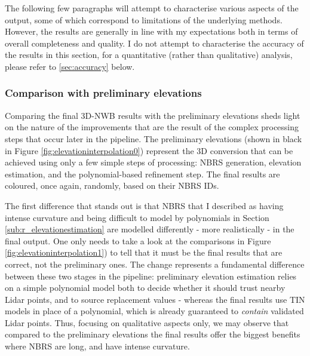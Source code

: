 The following few paragraphs will attempt to characterise various aspects of the output, some of which correspond to limitations of the underlying methods. However, the results are generally in line with my expectations both in terms of overall completeness and quality. I do not attempt to characterise the accuracy of the results in this section, for a quantitative (rather than qualitative) analysis, please refer to \ref{sec:accuracy} below.

\subsubsection{Comparison with preliminary elevations}

Comparing the final 3D-NWB results with the preliminary elevations sheds light on the nature of the improvements that are the result of the complex processing steps that occur later in the pipeline. The preliminary elevations (shown in black in Figure \ref{fig:elevationinterpolation0}) represent the 3D conversion that can be achieved using only a few simple steps of processing: NBRS generation, elevation estimation, and the polynomial-based refinement step. The final results are coloured, once again, randomly, based on their NBRS IDs.

The first difference that stands out is that NBRS that I described as having intense curvature and being difficult to model by polynomials in Section \ref{sub:r_elevationestimation} are modelled differently - more realistically - in the final output. One only needs to take a look at the comparisons in Figure \ref{fig:elevationinterpolation1}) to tell that it must be the final results that are correct, not the preliminary ones. The change represents a fundamental difference between these two stages in the pipeline: preliminary elevation estimation relies on a simple polynomial model both to decide whether it should trust nearby Lidar points, and to source replacement values - whereas the final results use TIN models in place of a polynomial, which is already guaranteed to \textit{contain} validated Lidar points. Thus, focusing on qualitative aspects only, we may observe that compared to the preliminary elevations the final results offer the biggest benefits where NBRS are long, and have intense curvature.

